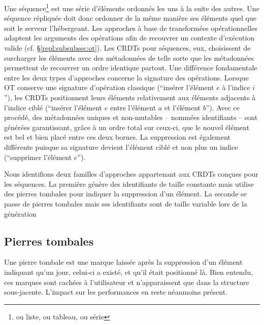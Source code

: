 
Une séquence\footnote{ou liste, ou tableau, ou série} est une série d'éléments
ordonnés les uns à la suite des autres. Une séquence répliquée doit donc
ordonner de la même manière ses éléments quel que soit le serveur
l'hébergeant. Les approches à base de transformées opérationnelles adaptent les
arguments des opérations afin de recouvrer un contexte d'exécution valide
(cf. §\ref{repl:subsubsec:ot}). Les CRDTs pour séquences, eux, choisissent de
surcharger les éléments avec des métadonnées de telle sorte que les métadonnées
permettent de recouvrer un ordre identique partout. Une différence fondamentale
entre les deux types d'approches concerne la signature des opérations. Lorsque
OT conserve une signature d'opération classique (``insérer l'élément $e$ à
l'indice $i$''), les CRDTs positionnent leurs éléments relativement aux éléments
adjacents à l'indice ciblé (``insérer l'élément $e$ entre l'élément $a$ et
l'élément $b$''). Avec ce procédé, des métadonnées uniques et non-mutables --
nommées identifiants -- sont générées garantissant, grâce à un ordre total sur
ceux-ci, que le nouvel élément est bel et bien placé entre ces deux bornes. La
suppression est également différente puisque sa signature devient l'élément
ciblé et non plus un indice (``supprimer l'élément $e$'').

Nous identifions deux familles d'approches appartenant aux CRDTs conçues pour
les séquences. La première génère des identifiants de taille constante mais
utilise des pierres tombales pour indiquer la suppression d'un élément. La
seconde se passe de pierres tombales mais ses identifiants sont de taille
variable lors de la génération

\subsection{Pierres tombales}

Une pierre tombale est une marque laissée après la suppression d'un élément
indiquant qu'un jour, celui-ci a existé, et qu'il était positionné là. Bien
entendu, ces marques sont cachées à l'utilisateur et n'apparaissent que dans la
structure sous-jacente. L'impact sur les performances en reste néanmoins
présent.


